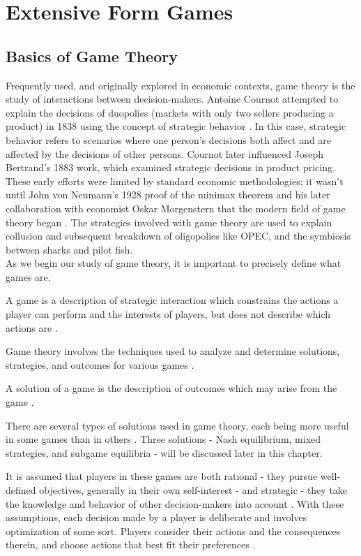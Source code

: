 \chapter{Extensive Form Games}
\section{Basics of Game Theory}
Frequently used, and originally explored in economic contexts, game theory is the study of interactions between decision-makers. Antoine Cournot attempted to explain the decisions of duopolies (markets with only two sellers producing a product) in 1838 using the concept of strategic behavior \cite{webs14}. In this case, strategic behavior refers to scenarios where one person's decisions both affect and are affected by the decisions of other persons. Cournot later influenced Joseph Bertrand's 1883 work, which examined strategic decisions in product pricing. These early efforts were limited by standard economic methodologies; it wasn't until John von Neumann's 1928 proof of the minimax theorem and his later collaboration with economist Oskar Morgenstern that the modern field of game theory began \cite{webs14}. The strategies involved with game theory are used to explain collusion and subsequent breakdown of oligopolies like OPEC, and the symbiosis between sharks and pilot fish.\\

As we begin our study of game theory, it is important to precisely define what games are.
\begin{define}
  A game is a description of strategic interaction which constrains the actions a player can perform and the interests of players, but does not describe which actions are \cite{osbo94}.
\end{define}

Game theory involves the techniques used to analyze and determine solutions, strategies, and outcomes for various games \cite{osbo94}.
\begin{define}
  A solution of a game is the description of outcomes which may arise from the game \cite{osbo94}.
\end{define}
There are several types of solutions used in game theory, each being more useful in some games than in others \cite{osbo94}. Three solutions - Nash equilibrium, mixed strategies, and subgame equilibria - will be discussed later in this chapter.

It is assumed that players in these games are both rational - they pursue well-defined objectives, generally in their own self-interest - and strategic - they take the knowledge and behavior of other decision-makers into account \cite{osbo94}. With these assumptions, each decision made by a player is deliberate and involves optimization of some sort. Players consider their actions and the consequences therein, and choose actions that best fit their preferences \cite{osbo94}.\\


